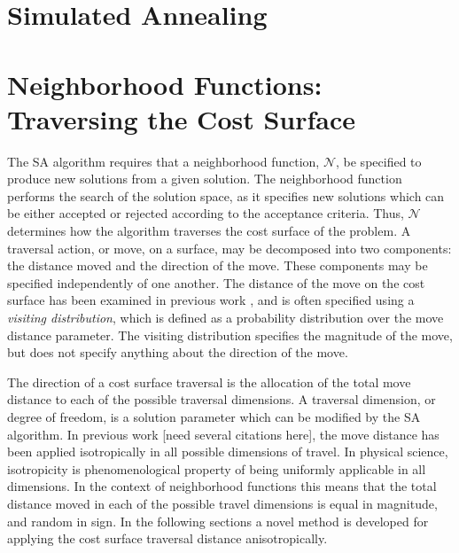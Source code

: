 \documentclass[11pt]{afthesis}
\begin{document}
	\section{Simulated Annealing}
	
	\section{Neighborhood Functions: Traversing the Cost Surface}
	
	The SA algorithm requires that a neighborhood function, \begin{math} \mathcal{N} \end{math}, be specified to produce new solutions from a given solution. The neighborhood function performs the search of the solution space, as it specifies new solutions which can be either accepted or rejected according to the acceptance criteria. Thus, \begin{math} \mathcal{N} \end{math} determines how the algorithm traverses the cost surface of the problem. A traversal action, or move, on a surface, may be decomposed into two components: the distance moved and the direction of the move. These components may be specified independently of one another. The distance of the move on the cost surface has been examined in previous work \cite{szu1987fastsimulatedannealing,tsallis1996generalizedsimulatedannealing}, and is often specified using a \textit{visiting distribution}, which is defined as a probability distribution over the move distance parameter. The visiting distribution specifies the magnitude of the move, but does not specify anything about the direction of the move. 
	
	The direction of a cost surface traversal is the allocation of the total move distance to each of the possible traversal dimensions. A traversal dimension, or degree of freedom, is a solution parameter which can be modified by the SA algorithm. In previous work [need several citations here]\cite{}, the move distance has been applied isotropically in all possible dimensions of travel. In physical science, isotropicity is phenomenological property of being uniformly applicable in all dimensions. In the context of neighborhood functions this means that the total distance moved in each of the possible travel dimensions is equal in magnitude, and random in sign. In the following sections a novel method is developed for applying the cost surface traversal distance anisotropically. 
	
\end{document}
